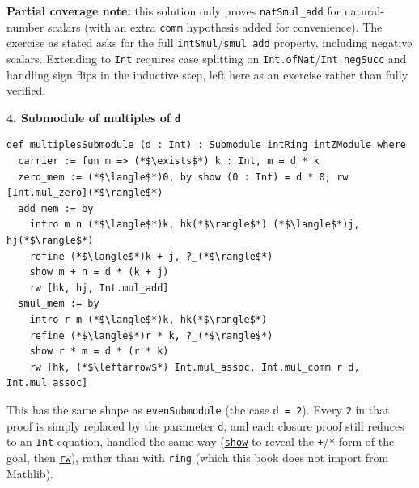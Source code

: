 \textbf{Partial coverage note:} this solution only proves \texttt{natSmul\_\allowbreak{}add} for natural-number scalars (with an extra \texttt{comm} hypothesis added for convenience). The exercise as stated asks for the full \texttt{intSmul}/\texttt{smul\_\allowbreak{}add} property, including negative scalars. Extending to \texttt{Int} requires case splitting on \texttt{Int.ofNat}/\texttt{Int.negSucc} and handling sign flips in the inductive step, left here as an exercise rather than fully verified.

\textbf{4. Submodule of multiples of \texttt{d}}

\begin{lstlisting}
def multiplesSubmodule (d : Int) : Submodule intRing intZModule where
  carrier := fun m => (*$\exists$*) k : Int, m = d * k
  zero_mem := (*$\langle$*)0, by show (0 : Int) = d * 0; rw [Int.mul_zero](*$\rangle$*)
  add_mem := by
    intro m n (*$\langle$*)k, hk(*$\rangle$*) (*$\langle$*)j, hj(*$\rangle$*)
    refine (*$\langle$*)k + j, ?_(*$\rangle$*)
    show m + n = d * (k + j)
    rw [hk, hj, Int.mul_add]
  smul_mem := by
    intro r m (*$\langle$*)k, hk(*$\rangle$*)
    refine (*$\langle$*)r * k, ?_(*$\rangle$*)
    show r * m = d * (r * k)
    rw [hk, (*$\leftarrow$*) Int.mul_assoc, Int.mul_comm r d, Int.mul_assoc]
\end{lstlisting}

This has the same shape as \texttt{evenSubmodule} (the case \texttt{d = 2}). Every \texttt{2} in that proof is simply replaced by the parameter \texttt{d}, and each closure proof still reduces to an \texttt{Int} equation, handled the same way (\href{https://lean-lang.org/doc/reference/latest/Tactic-Proofs/Tactic-Reference/}{\texttt{show}} to reveal the \texttt{+}/\texttt{*}-form of the goal, then \href{https://lean-lang.org/doc/reference/latest/Tactic-Proofs/Tactic-Reference/}{\texttt{rw}}), rather than with \texttt{ring} (which this book does not import from Mathlib).
